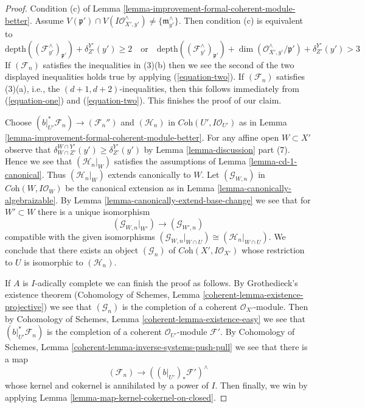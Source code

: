 \begin{proof}
\medskip\noindent
Condition (c) of
Lemma \ref{lemma-improvement-formal-coherent-module-better}. Assume
$V(\mathfrak p') \cap V(I\mathcal{O}_{X', y'}^\wedge) \not =
\{\mathfrak m_{y'}^\wedge\}$. Then condition (c) is equivalent to
$$
\text{depth}((\mathcal{F}_{y'}^\wedge)_{\mathfrak p'}) + \delta^{Y'}_{Z'}(y')
\geq 2
\quad\text{or}\quad
\text{depth}((\mathcal{F}_{y'}^\wedge)_{\mathfrak p'}) +
\dim(\mathcal{O}_{X', y'}^\wedge/\mathfrak p') +
\delta^{Y'}_{Z'}(y') > 3
$$
If $(\mathcal{F}_n)$ satisfies the inequalities in (3)(b)
then we see the second of the two displayed inequalities holds true
by applying (\ref{equation-two}). If $(\mathcal{F}_n)$ satisfies (3)(a), i.e.,
the $(d + 1, d + 2)$-inequalities, then this follows immediately from
(\ref{equation-one}) and (\ref{equation-two}).
This finishes the proof of our claim.

\medskip\noindent
Choose $(b|_{U'}^*\mathcal{F}_n) \to (\mathcal{F}_n'')$
and $(\mathcal{H}_n)$ in $\textit{Coh}(U', I\mathcal{O}_{U'})$
as in Lemma \ref{lemma-improvement-formal-coherent-module-better}.
For any affine open $W \subset X'$ observe that
$\delta^{W \cap Y'}_{W \cap Z'}(y') \geq \delta^{Y'}_{Z'}(y')$ by
Lemma \ref{lemma-discussion} part (7). Hence we see that
$(\mathcal{H}_n|_W)$ satisfies the assumptions of
Lemma \ref{lemma-cd-1-canonical}.
Thus $(\mathcal{H}_n|_W)$ extends canonically to $W$.
Let $(\mathcal{G}_{W, n})$ in $\textit{Coh}(W, I\mathcal{O}_W)$
be the canonical extension as in
Lemma \ref{lemma-canonically-algebraizable}.
By Lemma \ref{lemma-canonically-extend-base-change}
we see that for $W' \subset W$ there is a unique isomorphism
$$
(\mathcal{G}_{W, n}|_{W'}) \longrightarrow
(\mathcal{G}_{W', n})
$$
compatible with the given isomorphisms
$(\mathcal{G}_{W, n}|_{W \cap U}) \cong (\mathcal{H}_n|_{W \cap U})$.
We conclude that there exists an object
$(\mathcal{G}_n)$ of $\textit{Coh}(X', I\mathcal{O}_{X'})$
whose restriction to $U$ is isomorphic to $(\mathcal{H}_n)$.

\medskip\noindent
If $A$ is $I$-adically complete we can finish the proof as follows.
By Grothedieck's existence theorem
(Cohomology of Schemes, Lemma \ref{coherent-lemma-existence-projective})
we see that $(\mathcal{G}_n)$ is the completion of a coherent
$\mathcal{O}_{X'}$-module. Then by
Cohomology of Schemes, Lemma \ref{coherent-lemma-existence-easy}
we see that $(b|_{U'}^*\mathcal{F}_n)$
is the completion of a coherent $\mathcal{O}_{U'}$-module
$\mathcal{F}'$.
By Cohomology of Schemes, Lemma \ref{coherent-lemma-inverse-systems-push-pull}
we see that there is a map
$$
(\mathcal{F}_n) \longrightarrow ((b|_{U'})_*\mathcal{F}')^\wedge
$$
whose kernel and cokernel is annihilated by a power of $I$.
Then finally, we win by applying
Lemma \ref{lemma-map-kernel-cokernel-on-closed}.


\end{proof}
